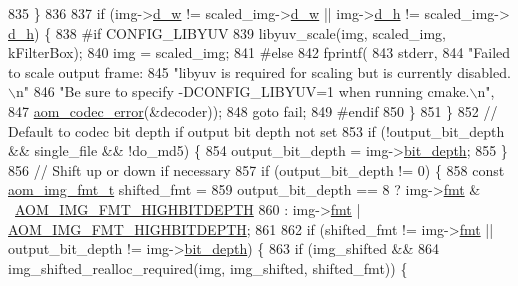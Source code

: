 \begin{DoxyCodeInclude}
{{{{{{{{{{{{{{{{{{{{{{{{{{{{{{{{{{{{{{{{{{{{{835           \}
836 
837           \textcolor{keywordflow}{if} (img->\hyperlink{structaom__image_a89f80b1f58d608b9d2080635f4359034}{d\_w} != scaled\_img->\hyperlink{structaom__image_a89f80b1f58d608b9d2080635f4359034}{d\_w} || img->\hyperlink{structaom__image_ab986419a1f0fff93a2dc505f47194988}{d\_h} != scaled\_img->
      \hyperlink{structaom__image_ab986419a1f0fff93a2dc505f47194988}{d\_h}) \{
838 \textcolor{preprocessor}{#if CONFIG\_LIBYUV}
839             libyuv\_scale(img, scaled\_img, kFilterBox);
840             img = scaled\_img;
841 \textcolor{preprocessor}{#else}
842             fprintf(
843                 stderr,
844                 \textcolor{stringliteral}{"Failed to scale output frame: %
845                 \textcolor{stringliteral}{"libyuv is required for scaling but is currently disabled.\(\backslash\)n"}
846                 \textcolor{stringliteral}{"Be sure to specify -DCONFIG\_LIBYUV=1 when running cmake.\(\backslash\)n"},
847                 \hyperlink{group__codec_ga50949c0854605c722832bbfb0803f5f4}{aom\_codec\_error}(&decoder));
848             \textcolor{keywordflow}{goto} fail;
849 \textcolor{preprocessor}{#endif}
850           \}
851         \}
852         \textcolor{comment}{// Default to codec bit depth if output bit depth not set}
853         \textcolor{keywordflow}{if} (!output\_bit\_depth && single\_file && !do\_md5) \{
854           output\_bit\_depth = img->\hyperlink{structaom__image_a46ed9ffd741938d306a0db5a24bdcf8e}{bit\_depth};
855         \}
856         \textcolor{comment}{// Shift up or down if necessary}
857         \textcolor{keywordflow}{if} (output\_bit\_depth != 0) \{
858           \textcolor{keyword}{const} \hyperlink{aom__image_8h_ab71efff8c7f49380fad23b93bc2e9bfc}{aom\_img\_fmt\_t} shifted\_fmt =
859               output\_bit\_depth == 8 ? img->\hyperlink{structaom__image_a6c64b1ab918d80d52eb8f5d6d957e825}{fmt} & ~\hyperlink{aom__image_8h_a607b37d91f75442f54223ecd85f1b6cb}{AOM\_IMG\_FMT\_HIGHBITDEPTH}
860                                     : img->\hyperlink{structaom__image_a6c64b1ab918d80d52eb8f5d6d957e825}{fmt} | \hyperlink{aom__image_8h_a607b37d91f75442f54223ecd85f1b6cb}{AOM\_IMG\_FMT\_HIGHBITDEPTH};
861 
862           \textcolor{keywordflow}{if} (shifted\_fmt != img->\hyperlink{structaom__image_a6c64b1ab918d80d52eb8f5d6d957e825}{fmt} || output\_bit\_depth != img->\hyperlink{structaom__image_a46ed9ffd741938d306a0db5a24bdcf8e}{bit\_depth}) \{
863             \textcolor{keywordflow}{if} (img\_shifted &&
864                 img\_shifted\_realloc\_required(img, img\_shifted, shifted\_fmt)) \{
}}}}}}}}}}}}}}}}}}}}}}}}}}}}}}}}}}}}}}}}}}}}}}
\end{DoxyCodeInclude}
